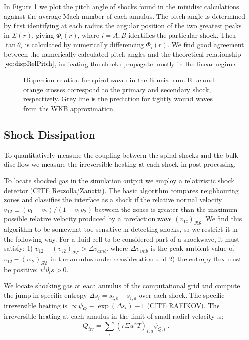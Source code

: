 \documentclass{emulateapj}
\begin{document}
In Figure \ref{fi:disp} we plot the pitch angle of shocks found in the minidisc calculations against the average Mach number of each annulus. The pitch angle is determined by first identifying at each radius the angular position of the two greatest peaks in $\Sigma(r)$, giving $\Phi_i(r)$, where $i=A,B$ identifies the particular shock. Then $\tan \theta_i$ is calculated by numerically differencing $\Phi_i(r)$. We find good agreement between the numerically calculated pitch angles and the theoretical relationship $\eqref{eq:dispRelPitch}$, indicating the shocks propagate mostly in the linear regime.

\begin{figure}
\caption{\label{fi:disp} Dispersion relation for spiral waves in the fiducial run. Blue and orange crosses correspond to the primary and secondary shock, respectively.  Grey line is the prediction for tightly wound waves from the WKB approximation.}
\end{figure}



\subsection{Shock Dissipation}
\label{subsec:diss}

To quantitatively measure the coupling between the spiral shocks and the bulk disc flow we measure the irreversible heating at each shock in post-processing. 

To locate shocked gas in the simulation output we employ a relativistic shock detector (CITE Rezzolla/Zanotti).  The basic algorithm compares neighbouring zones and classifies the interface as a shock if the relative normal velocity $v_{12} \equiv (v_1 - v_2) / (1-v_1 v_2)$ between the zones is greater than the maximum possible relative velocity produced by a rarefaction wave $(v_{12})_{\mathcal{RS}}$.  We find this algorithm to be somewhat too sensitive in detecting shocks, so we restrict it in the following way.  For a fluid cell to be considered part of a shockwave, it must satisfy: 1) $v_{12} - (v_{12})_{\mathcal{RS}} > \Delta v_{amb}$, where $\Delta v_{amb}$ is the peak ambient value of $v_{12} - (v_{12})_{\mathcal{RS}}$ in the annulus under consideration and 2) the entropy flux must be positive: $v^i \partial_i s > 0$.

We locate shocking gas at each annulus of the computational grid and compute the jump in specific entropy $\Delta s_i = s_{i,b} - s_{i,a}$ over each shock.  The specific irreversible heating is $\propto \psi_Q \equiv \exp{(\Delta s_i)} - 1$ (CITE RAFIKOV).  The irreversible heating at each annulus in the limit of small radial velocity is:
\begin{equation}
	\dot{Q}_{irr} = \sum_i \left( r\Sigma u^\phi T \right)_{i,a} \psi_{Q,i} \ . \label{eq:QirrRaf}
\end{equation}
\end{document}
